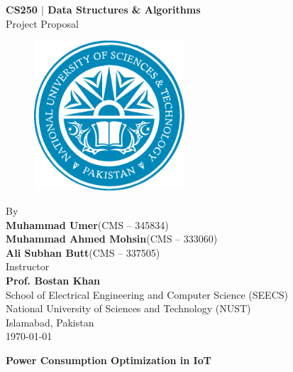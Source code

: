 \documentclass[11pt,a4paper]{article}
\begin{document}
\newpage
\begin{titlepage}
    \centering
    \vspace*{2pt}
    \huge{\textbf{CS250 $\mid$ Data Structures \& Algorithms}} \\
    \huge{Project Proposal} \\ [0.75cm]
    \begin{figure}[ht!]
        \centering
        \includegraphics[width=0.5\textwidth]{figs/nust.pdf}
    \end{figure}
    \vspace {0.75cm}
    \Large{By} \\
    \Large{\textbf{Muhammad Umer}\quad(CMS -- 345834)} \\
    \Large{\textbf{Muhammad Ahmed Mohsin}\quad(CMS -- 333060)} \\
    \Large{\textbf{Ali Subhan Butt}\quad(CMS -- 337505)} \\ [0.75cm]
 
    \Large{Instructor} \\ 
    \Large{\textbf{Prof. Bostan Khan}} \\ [0.75cm]
    \Large{School of Electrical Engineering and Computer Science (SEECS) \\
        National University of Sciences and Technology (NUST) \\
        Islamabad, Pakistan} \\ [0.75 cm]
    \Large{\today}
    \vspace{\fill} %
\end{titlepage}


\newpage
\setcounter{page}{1}

{\centering

\begin{LARGE}
\textbf{Power Consumption Optimization in IoT}
\end{LARGE}

\vspace{1em} %
}
\end{document}
